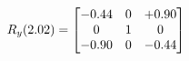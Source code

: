 \documentclass[preview]{standalone}
\begin{document}
\begin{align*}
\special{dvisvgm:raw <g id='unique000'>}R_{y}(2.02) = \begin{bmatrix}-0.44 & 0 & +0.90 \\0 & 1 & 0 \\-0.90 & 0 & -0.44\end{bmatrix}\special{dvisvgm:raw </g>}
\end{align*}
\end{document}
